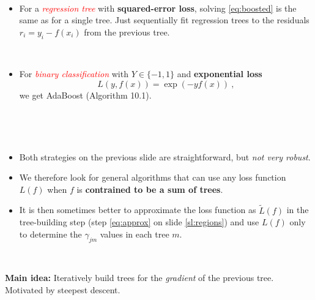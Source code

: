 \documentclass[
  10pt,
  ignorenonframetext,
]{beamer}
\providecommand{\tightlist}{%
  \setlength{\itemsep}{0pt}\setlength{\parskip}{0pt}}
\begin{document}
\begin{frame}
\(~\)

\begin{itemize}
\tightlist
\item
  For a \emph{\textcolor{red}{regression tree}} with
  \textbf{squared-error loss}, solving \eqref{eq:boosted} is the same as
  for a single tree. Just sequentially fit regression trees to the
  residuals \(r_i = y_i - f(x_i)\) from the previous tree.
\end{itemize}

\(~\)

\begin{itemize}
\tightlist
\item
  For \emph{\textcolor{red}{binary classification}} with
  \(Y\in \{-1,1\}\) and \textbf{exponential loss}
  \[L(y,f(x))=\exp(-yf(x)) \ ,\] we get AdaBoost (Algorithm 10.1).
\end{itemize}

\(~\)
\end{frame}

\begin{frame}
\(~\)

\begin{itemize}
\tightlist
\item
  Both strategies on the previous slide are straightforward, but
  \emph{not very robust}.
\end{itemize}

\vspace{2mm}

\begin{itemize}
\tightlist
\item
  We therefore look for general algorithms that can use any loss
  function \(L(f)\) when \(f\) is \textbf{contrained to be a sum of
  trees}.
\end{itemize}

\vspace{2mm}

\begin{itemize}
\tightlist
\item
  It is then sometimes better to approximate the loss function as
  \(\tilde{L}(f)\) in the tree-building step (step \eqref{eq:approx} on
  slide \ref{sl:regions}) and use \(L(f)\) only to determine the
  \(\gamma_{jm}\) values in each tree \(m\).
\end{itemize}

\(~\)

\textbf{Main idea:} Iteratively build trees for the \emph{gradient} of
the previous tree. Motivated by steepest descent.
\end{frame}
\end{document}
